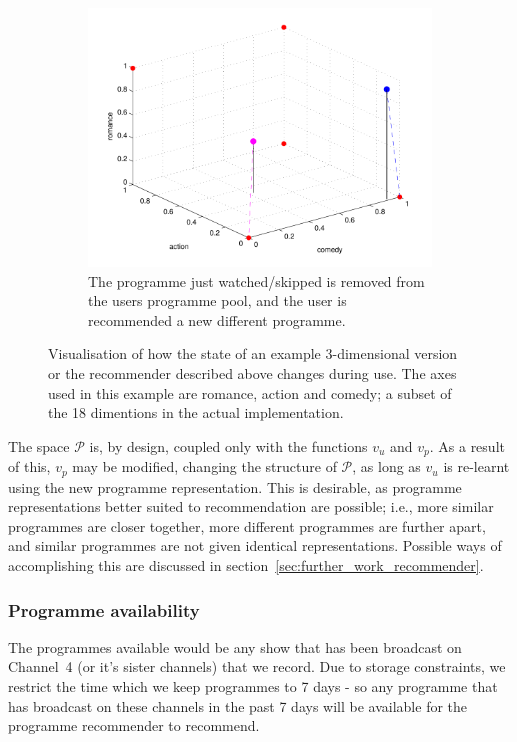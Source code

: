 \begin{figure}[h!]
\begin{center}
\begin{subfigure}[t]{0.32\textwidth}
				\end{subfigure}
				\begin{subfigure}[t]{0.32\textwidth}
					\includegraphics[width=\textwidth]{images/recommender_3.pdf}
					\caption{The programme just watched/skipped is removed from the users programme pool, and the user is recommended a new different programme.}
				\end{subfigure}
				\caption{Visualisation of how the state of an example 3-dimensional version or the recommender described above changes during use. The axes used in this example are romance, action and comedy; a subset of the 18 dimentions in the actual implementation.}
				\label{fig:recommender_example}
			\end{center}
		\end{figure}

		The space $\mathcal{P}$ is, by design, coupled only with the functions $v_u$ and $v_p$. As a result of this, $v_p$ may be modified, changing the structure of $\mathcal{P}$, as long as $v_u$ is re-learnt using the new programme representation. This is desirable, as programme representations better suited to recommendation are possible; i.e., more similar programmes are closer together, more different programmes are further apart, and similar programmes are not given identical representations. Possible ways of accomplishing this are discussed in section~\ref{sec:further_work_recommender}.

	\subsubsection{Programme availability}

		The programmes available would be any show that has been broadcast on Channel~4 (or it's sister channels) that we record. Due to storage constraints, we restrict the time which we keep programmes to 7 days - so any programme that has broadcast on these channels in the past 7 days will be available for the programme recommender to recommend.
